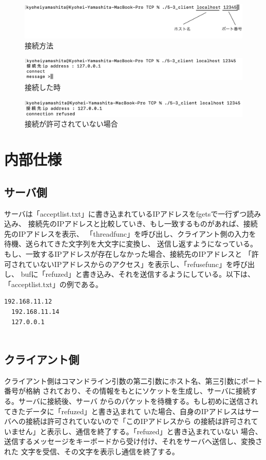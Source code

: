\documentclass[dvipdfmx,autodetect-engine,titlepage]{jsarticle}
\begin{document}
\begin{figure}[h]
    \centering
    \includegraphics[scale=0.8]{pic5.png}
    \caption{接続方法}
  \end{figure}

  \begin{figure}[h]
    \centering
    \includegraphics[scale=0.85]{pic6.png}
    \caption{接続した時}
  \end{figure}

  \begin{figure}[h]
    \centering
    \includegraphics[scale=0.85]{pic8.png}
    \caption{接続が許可されていない場合}
  \end{figure}


\section{内部仕様}
\subsection{サーバ側}
サーバは「acceptlist.txt」に書き込まれているIPアドレスをfgetsで一行ずつ読み込み、
接続先のIPアドレスと比較していき、もし一致するものがあれば、接続先のIPアドレスを表示、
「threadfunc」を呼び出し、クライアント側の入力を待機、送られてきた文字列を大文字に変換し、
送信し返すようになっている。もし、一致するIPアドレスが存在しなかった場合、接続先のIPアドレスと
「許可されていないIPアドレスからのアクセス」を表示し、「refusefunc」を呼び出し、
bufに「refuzed」と書き込み、それを送信するようにしている。以下は、「acceptlist.txt」の例である。

\begin{lstlisting}[caption=acceptlist,label=txt]
  192.168.11.12
  192.168.11.14
  127.0.0.1    
  
\end{lstlisting}

\subsection{クライアント側}
クライアント側はコマンドライン引数の第二引数にホスト名、第三引数にポート番号が格納
されており、その情報をもとにソケットを生成し、サーバに接続する。サーバに接続後、サーバ
からのパケットを待機する。もし初めに送信されてきたデータに「refuzed」と書き込まれて
いた場合、自身のIPアドレスはサーバへの接続は許可されていないので「このIPアドレスから
の接続は許可されていません」と表示し、通信を終了する。「refuzed」と書き込まれていない
場合、送信するメッセージをキーボードから受け付け、それをサーバへ送信し、変換された
文字を受信、その文字を表示し通信を終了する。
\end{document}
